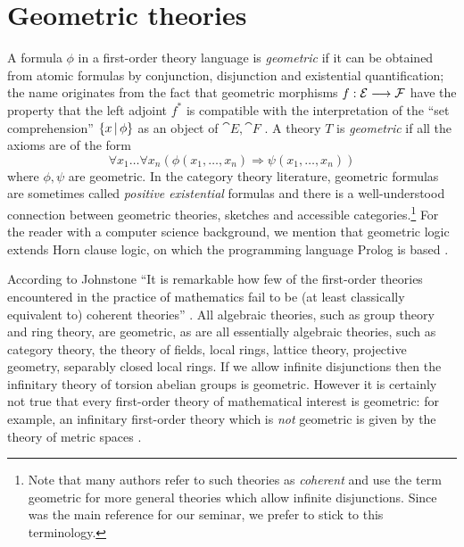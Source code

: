 \documentclass[english,letter paper,12pt,reqno]{article}
\theoremstyle{example}
\begin{document}
\appendix

\section{Geometric theories}\label{section:geometric}

A formula $\phi$ in a first-order theory language is \emph{geometric} if it can be obtained from atomic formulas by conjunction, disjunction and existential quantification; the name originates from the fact that geometric morphisms $f: \mathcal{E} \longrightarrow \mathcal{F}$ have the property that the left adjoint $f^*$ is compatible with the interpretation of the ``set comprehension'' $\{ x \,|\, \phi \}$ as an object of $\cat{E}, \cat{F}$ \cite[Theorem X.5]{topos}. A theory $T$ is \emph{geometric} if all the axioms are of the form
\[
\forall x_1 \ldots \forall x_n ( \phi(x_1,\ldots,x_n) \Longrightarrow \psi(x_1,\ldots,x_n) )
\]
where $\phi, \psi$ are geometric. In the category theory literature, geometric formulas are sometimes called \emph{positive existential} formulas \cite[p.45]{makkai} and there is a well-understood connection between geometric theories, sketches and accessible categories.\footnote{Note that many authors refer to such theories as \emph{coherent} and use the term geometric for more general theories which allow infinite disjunctions. Since \cite{topos} was the main reference for our seminar, we prefer to stick to this terminology.} For the reader with a computer science background, we mention that geometric logic extends Horn clause logic, on which the programming language Prolog is based \cite{bezem2}.

According to Johnstone ``It is remarkable how few of the first-order theories encountered in the practice of mathematics fail to be (at least classically equivalent to) coherent theories'' \cite[\S D.1.1]{johnstone}. All algebraic theories, such as group theory and ring theory, are geometric, as are all essentially algebraic theories, such as category theory, the theory of fields, local rings, lattice theory, projective geometry, separably closed local rings. If we allow infinite disjunctions then the infinitary theory of torsion abelian groups is geometric. However it is certainly not true that every first-order theory of mathematical interest is geometric: for example, an infinitary first-order theory which is \emph{not} geometric is given by the theory of metric spaces \cite[Example 1.1.7(l)]{johnstone}.
\end{document}
